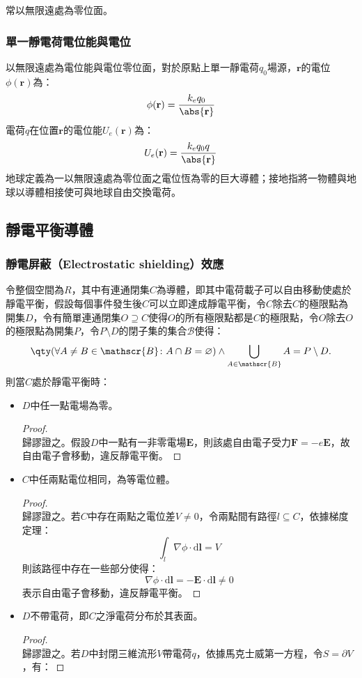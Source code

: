 \documentclass[a4paper,12pt]{report}
\begin{document}
\begin{itemize}
常以無限遠處為零位面。
\subsubsection{單一靜電荷電位能與電位}
以無限遠處為電位能與電位零位面，對於原點上單一靜電荷$q_0$場源，$\mathbf{r}$的電位$\phi(\mathbf{r})$為：
\[\phi(\mathbf{r})=\frac{k_eq_0}{\abs{\mathbf{r}}}\]
電荷$q$在位置$\mathbf{r}$的電位能$U_e(\mathbf{r})$為：
\[U_e(\mathbf{r})=\frac{k_eq_0q}{\abs{\mathbf{r}}}\]
地球定義為一以無限遠處為零位面之電位恆為零的巨大導體；接地指將一物體與地球以導體相接使可與地球自由交換電荷。
\subsection{靜電平衡導體}
\subsubsection{靜電屏蔽（Electrostatic shielding）效應}
令整個空間為$R$，其中有連通閉集$C$為導體，即其中電荷載子可以自由移動使處於靜電平衡，假設每個事件發生後$C$可以立即達成靜電平衡，令$C$除去$C$的極限點為開集$D$，令有簡單連通閉集$O\supseteq C$使得$O$的所有極限點都是$C$的極限點，令$O$除去$O$的極限點為開集$P$，令$P\setminus D$的閉子集的集合$\mathscr{B}$使得：
\[\qty(\forall A\neq B\in\mathscr{B}\colon A\cap B=\varnothing)\land\bigcup_{A\in\mathscr{B}}A=P\setminus D.\]
則當$C$處於靜電平衡時：
\begin{itemize}
\item $D$中任一點電場為零。
\begin{proof}\mbox{}\\
歸謬證之。假設$D$中一點有一非零電場$\mathbf{E}$，則該處自由電子受力$\mathbf{F}=-e\mathbf{E}$，故自由電子會移動，違反靜電平衡。
\end{proof}
\item $C$中任兩點電位相同，為等電位體。
\begin{proof}\mbox{}\\
歸謬證之。若$C$中存在兩點之電位差$V\neq 0$，令兩點間有路徑$l\subseteq C$，依據梯度定理：
\[\int_{l}\nabla\phi\cdot\mathrm{d}\mathbf{l}=V\]
則該路徑中存在一些部分使得：
\[\nabla\phi\cdot\mathrm{d}\mathbf{l}=-\mathbf{E}\cdot\mathrm{d}\mathbf{l}\neq 0\]
表示自由電子會移動，違反靜電平衡。
\end{proof}
\item $D$不帶電荷，即$C$之淨電荷分布於其表面。
\begin{proof}\mbox{}\\
歸謬證之。若$D$中封閉三維流形$V$帶電荷$q$，依據馬克士威第一方程，令$S=\partial V$，有：

\end{proof}
\end{itemize}
\end{itemize}
\end{document}
